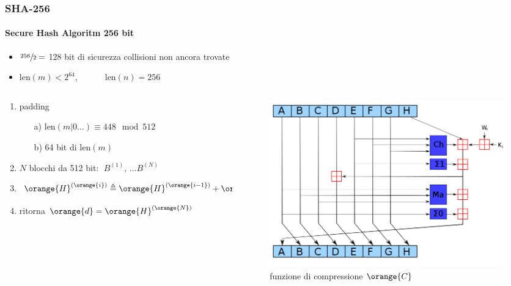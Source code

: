 \begin{frame}
	\frametitle{SHA-256}
	\framesubtitle{Secure Hash Algoritm 256 bit}
	
	\begin{itemize}	 
			\item $\sfrac{256}{2}=$ {\color{blue}128 bit di sicurezza}\;\;\; collisioni non ancora trovate 
			\item $\mathrm{len}(m)< 2^{64},\;\;\;\;\;\;\;\;\;\;\; \text{len}(n)=256$
	\end{itemize}

	\begin{columns}
	 \begin{column}{.65\textwidth}
		\begin{enumerate}	 
		  	\item padding
		  	\begin{enumerate}
		  	  	\item[a)] $\mathrm{len}(m|0\dots)\equiv448\mod512$
				\item[b)] 64 bit di $\mathrm{len}(m)$
			\end{enumerate}  
			\item $N$ blocchi da 512 bit: $\; B^{(1)},\,\dots B^{(N)} $
			\item $$ \orange{H}^{(\orange{i})} \triangleq \orange{H}^{(\orange{i-1})} + 
						\orange{C}_{\orange{B}^{(\orange{i})}}(\orange{H}^{(\orange{i-1})})$$
			\item ritorna $\orange{d}=\orange{H}^{(\orange{N})}$
		\end{enumerate}
	 \end{column}
	
	 \begin{column}{.55\textwidth}
	 	\begin{figure}
		 	\includegraphics[height = 4 cm]{images/sha2.png}
		 	\caption{funzione di compressione $\orange{C}$}
	 	\end{figure}
	 \end{column}
	\end{columns}

\end{frame}